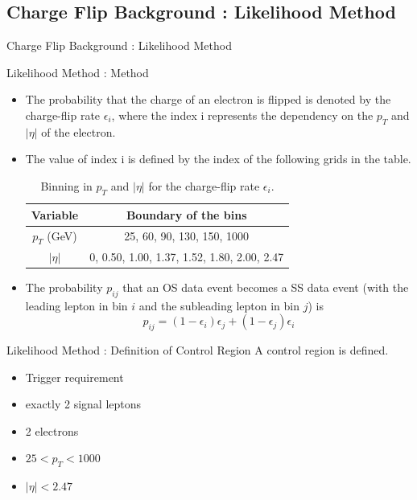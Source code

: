 \documentclass[mathserif,serif]{beamer}
\begin{document}
\subsection{Charge Flip Background : Likelihood Method}
\begin{frame}
\begin{center}
\huge
Charge Flip Background : Likelihood Method
\end{center}
\end{frame}

\begin{frame}{Likelihood Method : Method}
\begin{itemize}
\item The probability that the charge of an electron is flipped is denoted by the charge-flip rate $\epsilon_i$, where the index i represents the dependency on the $p_T$ and $|\eta|$ of the electron.
\item The value of index i is defined by the index of the following grids in the table.

\begin{table}[htbp]
\centering
\begin{tabular}{|c|c|}
\hline
Variable & Boundary of the bins \\
\hline
$p_T$ (GeV) &  25, 60, 90, 130, 150, 1000 \\
\hline
$|\eta|$ & 0, 0.50, 1.00, 1.37, 1.52, 1.80, 2.00, 2.47 \\
\hline
\end{tabular}
\caption{Binning in $p_T$ and $|\eta|$ for the charge-flip rate $\epsilon_i$.}
\end{table}

\item The probability $p_{ij}$ that an OS data event becomes a SS data event (with the leading lepton in bin $i$ and the subleading lepton in bin $j$) is
\begin{equation*}
p_{ij} = (1 - \epsilon_i)\epsilon_j + (1 - \epsilon_j)\epsilon_i
\end{equation*}
\end{itemize}

\end{frame}

\begin{frame}{Likelihood Method : Definition of Control Region}
A control region is defined.
\begin{itemize}
\item Trigger requirement
\item exactly 2 signal leptons
\item 2 electrons
\item $25 <p_T < 1000$
\item $|\eta| < 2.47$
\end{itemize}
\end{frame}
\end{document}
